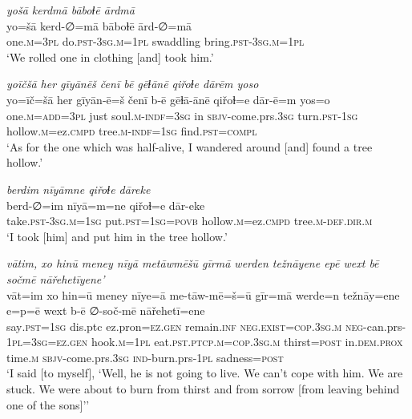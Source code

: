 \ea \label{ZQ.22}
\textit{yošā kerdmā bāboɫē ārdmā} \\ 
\gll yo=šā kerd-∅=mā bāboɫē ārd-∅=mā \\ 
 one\textsc{.m}\textsc{=3pl} do\textsc{.pst}\textsc{-3sg}\textsc{.m}\textsc{=\textsc{1pl}} swaddling bring\textsc{.pst}\textsc{-3sg}\textsc{.m}\textsc{=\textsc{1pl}} \\ 
\glt `We rolled one in clothing [and] took him.'
\z 
 
\ea \label{ZQ.23}
\textit{yoīčšā her gīyānēš čenī bē gēɫānē qiřoɫe dārēm yoso} \\ 
\gll yo=īč=šā her gīyān-ē=š čenī b-ē gēɫā-ānē qiřoɫ=e dār-ē=m yos=o \\ 
 one\textsc{.m}\textsc{=add}\textsc{=3pl} just soul\textsc{.m}\textsc{-indf}\textsc{=3sg} in \textsc{sbjv-}come.prs\textsc{.3sg} turn\textsc{.pst}\textsc{-\textsc{1sg}} hollow\textsc{.m}=ez\textsc{.cmpd} tree\textsc{.m}\textsc{-indf}\textsc{=\textsc{1sg}} find\textsc{.pst}\textsc{=compl} \\ 
\glt `As for the one which was half-alive, I wandered around [and] found a tree hollow.'
\z 
 
\ea \label{ZQ.24}
\textit{berdim nīyāmne qiřoɫe dāreke} \\ 
\gll berd-∅=im nīyā=m=ne qiřoɫ=e dār-eke \\ 
 take\textsc{.pst}\textsc{-3sg}\textsc{.m}\textsc{=\textsc{1sg}} put\textsc{.pst}\textsc{=\textsc{1sg}}\textsc{=\textsc{povb}} hollow\textsc{.m}=ez\textsc{.cmpd} tree\textsc{.m}\textsc{-def}\textsc{.dir}\textsc{.m} \\ 
\glt `I took [him] and put him in the tree hollow.'
\z 
 
\ea \label{ZQ.25}
\textit{vātim, xo hinū meney nīyā metāwmēšū gīrmā werden težnāyene epē wext bē sočmē nāřehetīyene’} \\ 
\gll vāt=im xo hin=ū meney nīye=ā me-tāw-mē=š=ū gīr=mā werde=n težnāy=ene e=p=ē wext b-ē ∅-soč-mē nāřehetī=ene \\ 
 say\textsc{.pst}\textsc{=\textsc{1sg}} dis.ptc ez.pron\textsc{=ez.gen} remain\textsc{.inf} \textsc{\textsc{neg.}exist}\textsc{=cop}\textsc{.3sg}\textsc{.m} \textsc{neg-}can.prs\textsc{-\textsc{1pl}}\textsc{=3sg}\textsc{=ez.gen} hook\textsc{.m}\textsc{=\textsc{1pl}} eat\textsc{.pst}\textsc{.ptcp}\textsc{.m}\textsc{=cop}\textsc{.3sg}\textsc{.m} thirst\textsc{=\textsc{post}} in.\textsc{dem.prox} time\textsc{.m} \textsc{sbjv-}come.prs\textsc{.3sg} \textsc{ind-}burn.prs\textsc{-\textsc{1pl}} sadness\textsc{=\textsc{post}} \\ 
\glt `I said [to myself], ‘Well, he is not going to live. We can’t cope with him. We are stuck. We were about to burn from thirst and from sorrow [from leaving behind one of the sons]’'
\z 
 
